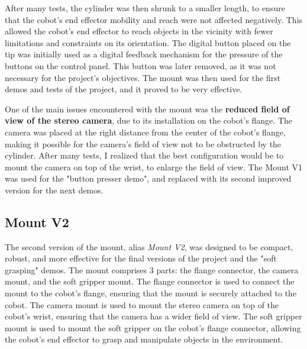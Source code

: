 After many tests, the cylinder was then shrunk to a smaller length, to ensure that the cobot's end effector
mobility and reach were not affected negatively. This allowed the cobot's end effector to reach objects
in the vicinity with fewer limitations and constraints on its orientation.
The digital button placed on the tip was initially used as a digital feedback mechanism for the pressure
of the buttons on the control panel. This button was later removed, as it was not necessary for the project's
objectives. The mount was then used for the first demos and tests of the project, and it proved to be very effective.

One of the main issues encountered with the mount was the \textbf{reduced field of view of the stereo camera}, due to its
installation on the cobot's flange. The camera was placed at the right distance from the center of the cobot's flange,
making it possible for the camera's field of view not to be obstructed by the cylinder.
After many tests, I realized that the best configuration would be to mount the camera on top of the wrist,
to enlarge the field of view. The Mount V1 was used for the "button presser demo", and replaced with its 
second improved version for the next demos.

\subsection{Mount V2}


The second version of the mount, alias \textit{Mount V2}, was designed to be compact, robust, and more effective
for the final versions of the project and the "soft grasping" demos. The mount comprises 3 parts:
the flange connector, the camera mount, and the soft gripper mount. The flange connector is used to connect
the mount to the cobot's flange, ensuring that the mount is securely attached to the cobot. The camera mount
is used to mount the stereo camera on top of the cobot's wrist, ensuring that the camera has a wider field of view.
The soft gripper mount is used to mount the soft gripper on the cobot's flange connector, allowing the cobot's
end effector to grasp and manipulate objects in the environment.


